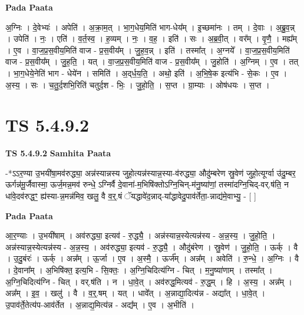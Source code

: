 \documentclass[17pt]{extarticle}
\begin{document}
\textbf{Pada Paata} \newline

अ॒ग्निः । दे॒वेभ्यः॑ । अपेति॑ । अ॒क्रा॒म॒त् । भा॒ग॒धेय॒मिति॑ भाग-धेय᳚म् । इ॒च्छमा॑नः । तम् । दे॒वाः । अ॒ब्रु॒व॒न्न् । उपेति॑ । नः॒ । एति॑ । व॒र्त॒स्व॒ । ह॒व्यम् । नः॒ । व॒ह॒ । इति॑ । सः । अ॒ब्र॒वी॒त् । वर᳚म् । वृ॒णै॒ । मह्य᳚म् । ए॒व । वा॒ज॒प्र॒स॒वीय॒मिति॑ वाज - प्र॒स॒वीय᳚म् । जु॒ह॒व॒न्न् । इति॑ । तस्मा᳚त् । अ॒ग्नये᳚ । वा॒ज॒प्र॒स॒वीय॒मिति॑ वाज - प्र॒स॒वीय᳚म् । जु॒ह॒ति॒ । यत् । वा॒ज॒प्र॒स॒वीय॒मिति॑ वाज - प्र॒स॒वीय᳚म् । जु॒होति॑ । अ॒ग्निम् । ए॒व । तत् । भा॒ग॒धेये॒नेति॑ भाग - धेये॑न । समिति॑ । अ॒द्‌र्ध॒य॒ति॒ । अथो॒ इति॑ । अ॒भि॒षे॒क इत्य॑भि - से॒कः । ए॒व । अ॒स्य॒ । सः । च॒तु॒र्द॒शभि॒रिति॑ चतुर्द॒श - भिः॒ । जु॒हो॒ति॒ । स॒प्त । ग्रा॒म्याः । ओष॑धयः । स॒प्त ।  \newline




\section*{ TS 5.4.9.2 }

\textbf{TS 5.4.9.2 } \newline
\textbf{Samhita Paata} \newline

-*ऽऽर॒ण्या उ॒भयी॑षा॒मव॑रुद्ध्या॒ अन्न॑स्यान्नस्य जुहो॒त्यन्न॑स्यान्न॒स्या-व॑रुद्ध्या॒ औदु॑म्बरेण स्रु॒वेण॑ जुहो॒त्यूर्ग्वा उ॑दु॒म्बर॒ ऊर्गन्न॑मू॒र्जैवास्मा॒ ऊर्ज॒मन्न॒मव॑ रुन्धे॒ ऽग्निर्वै दे॒वाना॑-म॒भिषि॑क्तोऽग्नि॒चिन्-म॑नु॒ष्या॑णां॒ तस्मा॑दग्नि॒चिद्-वर्.ष॑ति॒ न धा॑वे॒दव॑रुद्धꣳ॒॒ ह्य॑स्या-न्न॒मन्न॑मिव॒ खलु॒ वै व॒र्॒.षं ॅयद्धावे॑द॒न्नाद्-या᳚द्धावेदु॒पाव॑र्तेता॒-न्नाद्य॑मे॒वाभ्यु॒ - [  ] \newline

\textbf{Pada Paata} \newline

आ॒र॒ण्याः । उ॒भयी॑षाम् । अव॑रुद्ध्या॒ इत्यव॑ - रु॒द्ध्यै॒ । अन्न॑स्यान्न॒स्येत्यन्न॑स्य - अ॒न्न॒स्य॒ । जु॒हो॒ति॒ । अन्न॑स्यान्न॒स्येत्यन्न॑स्य - अ॒न्न॒स्य॒ । अव॑रुद्ध्या॒ इत्यव॑ - रु॒द्ध्यै॒ । औदु॑बंरेण । स्रु॒वेण॑ । जु॒हो॒ति॒ । ऊर्क् । वै । उ॒दु॒बंरः॑ । ऊर्क् । अन्न᳚म् । ऊ॒र्जा । ए॒व । अ॒स्मै॒ । ऊर्ज᳚म् । अन्न᳚म् । अवेति॑ । रु॒न्धे॒ । अ॒ग्निः । वै । दे॒वाना᳚म् । अ॒भिषि॑क्त॒ इत्य॒भि - सि॒क्तः॒ । अ॒ग्नि॒चिदित्य॑ग्नि - चित् । म॒नु॒ष्या॑णाम् । तस्मा᳚त् । अ॒ग्नि॒चिदित्य॑ग्नि - चित् । वर्.ष॑ति । न । धा॒वे॒त् । अव॑रुद्ध॒मित्यव॑ - रु॒द्ध॒म् । हि । अ॒स्य॒ । अन्न᳚म् । अन्न᳚म् । इ॒व॒ । खलु॑ । वै । व॒र्॒.षम् । यत् । धावे᳚त् । अ॒न्नाद्या॒दित्य॑न्न - अद्या᳚त् । धा॒वे॒त् । उ॒पाव॑र्ते॒तेत्य॑प-आव॑र्तेत । अ॒न्नाद्य॒मित्य॑न्न - अद्य᳚म् । ए॒व । अ॒भीति॑ ।  \newline
\end{document}
